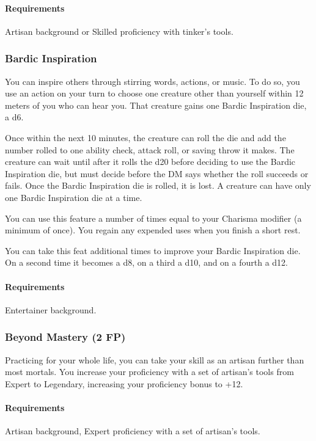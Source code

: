     \paragraph{Requirements} Artisan background or Skilled proficiency with tinker's tools.
\subsubsection{Bardic Inspiration} \label{feat::bardicinspiration}
    You can inspire others through stirring words, actions, or music.
    To do so, you use an action on your turn to choose one creature other than yourself within 12 meters of you who can hear you.
    That creature gains one Bardic Inspiration die, a d6.

    Once within the next 10 minutes, the creature can roll the die and add the number rolled to one ability check, attack roll, or saving throw it makes.
    The creature can wait until after it rolls the d20 before deciding to use the Bardic Inspiration die, but must decide before the DM says whether the roll succeeds or fails.
    Once the Bardic Inspiration die is rolled, it is lost.
    A creature can have only one Bardic Inspiration die at a time.

    You can use this feature a number of times equal to your Charisma modifier (a minimum of once).
    You regain any expended uses when you finish a short rest.

    You can take this feat additional times to improve your Bardic Inspiration die.
    On a second time it becomes a d8, on a third a d10, and on a fourth a d12.

    \paragraph{Requirements} Entertainer background.
\subsubsection{Beyond Mastery (2 FP)} \label{feat::beyondmastery}
    Practicing for your whole life, you can take your skill as an artisan further than most mortals.
    You increase your proficiency with a set of artisan's tools from Expert to Legendary, increasing your proficiency bonus to +12.
    \paragraph{Requirements} Artisan background, Expert proficiency with a set of artisan's tools.
